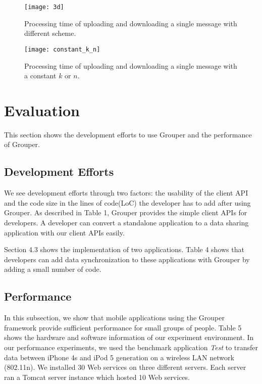 \begin{figure*}[t]
	\centering
	\texttt{[image: 3d]}
	\caption{Processing time of uploading and downloading a single message with different scheme.}
\end{figure*}

\begin{figure*}[t]
	\centering
	\texttt{[image: constant\_k\_n]}
	\caption{Processing time of uploading and downloading a single message with a constant ${k}$ or ${n}$.}
\end{figure*}

\section{Evaluation}

This section shows the development efforts to use Grouper and the performance of Grouper.

\subsection{Development Efforts}

We see development efforts through two factors: the usability of the client API and the code size in the lines of code(LoC) the developer has to add after using Grouper. 
As described in Table 1, Grouper provides the simple client APIs for developers.
A developer can convert a standalone application to a data sharing application with our client APIs easily.

Section 4.3 shows the implementation of two applications.
Table 4 shows that developers can add data synchronization to these applications with Grouper by adding a small number of code. 

\subsection{Performance}

In this subsection, we show that mobile applications using the Grouper framework provide sufficient performance for small groups of people.
Table 5 shows the hardware and software information of our experiment environment.
In our performance experiments, we used the benchmark application \emph{Test} to transfer data between iPhone 4s and iPod 5 generation on a wireless LAN network (802.11n).
We installed 30 Web services on three different servers.
Each server ran a Tomcat server instance which hosted 10 Web services.

